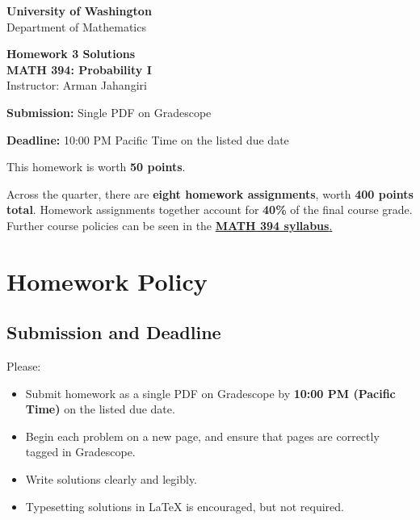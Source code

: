 \documentclass[11pt]{article}
\newcommand{\course}{MATH 394: Probability I}
\newcommand{\department}{Department of Mathematics}
\newcommand{\university}{University of Washington}
\begin{document}
\begin{titlepage}
\centering
\vspace*{1.2cm}

{\Large \textbf{\university}}\\
{\large \department}

\vspace{1.5cm}

{\Huge \color{uwpurple}\textbf{Homework 3 Solutions}}\\[0.25cm]
{\Large \textbf{\course}}\\[0.25cm]
{\large Instructor: Arman Jahangiri}

\vspace{1cm}

\begin{tcolorbox}[
    width=0.78\textwidth,
    colback=softpurple,
    colframe=uwpurple,
    boxrule=0.9pt,
    arc=3mm
]
\centering

\textbf{Submission:} Single PDF on Gradescope

\textbf{Deadline:} 10:00 PM Pacific Time on the listed due date
\end{tcolorbox}

\vspace{0.8cm}

\begin{tcolorbox}[
    width=0.86\textwidth,
    colback=white,
    colframe=uwgold,
    boxrule=0.8pt,
    arc=3mm
]
This homework is worth \textbf{50 points}.

Across the quarter, there are \textbf{eight homework assignments}, worth \textbf{400 points total}. Homework assignments together account for \textbf{40\%} of the final course grade. Further course policies can be seen in the \href{https://armanjg.github.io/MATH-394-Probability-1-v2/}{\textbf{MATH 394 syllabus}.}
\end{tcolorbox}

\vfill
\end{titlepage}

\section*{Homework Policy}

\subsection*{Submission and Deadline}

Please:

\begin{itemize}[leftmargin=*]
    \item Submit homework as a single PDF on Gradescope by \textbf{10:00 PM (Pacific Time)} on the listed due date.
    \item Begin each problem on a new page, and ensure that pages are correctly tagged in Gradescope.
    \item Write solutions clearly and legibly.
    \item Typesetting solutions in LaTeX is encouraged, but not required.
\end{itemize}
\end{document}
